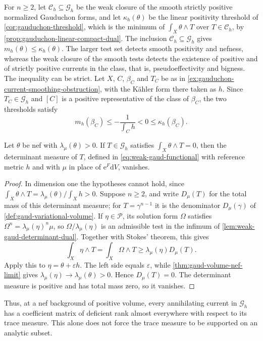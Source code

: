 For $n\geq2$, let $\mathscr C_h\subseteq\mathscr G_h$ be the weak closure of the smooth strictly positive normalized Gauduchon forms, and let $\kappa_h(\theta)$ be the linear positivity threshold of \cref{cor:gauduchon-threshold}, which is the minimum of $\int_X\theta\wedge T$ over $T\in\mathscr C_h$, by \cref{prop:gauduchon-linear-compact-dual}. The inclusion $\mathscr C_h\subseteq\mathscr G_h$ gives
$m_h(\theta)\leq\kappa_h(\theta)$.
The larger test set detects smooth positivity and nefness, whereas the weak closure of the smooth tests detects the existence of positive and of strictly positive currents in the class, that is, pseudoeffectivity and bigness. The inequality can be strict. Let $X$, $C$, $\beta_C$ and $T_C$ be as in \cref{ex:gauduchon-current-smoothing-obstruction}, with the K\"ahler form there taken as $h$. Since $T_C\in\mathscr G_h$ and $[C]$ is a positive representative of the class of $\beta_C$, the two thresholds satisfy
\[
 m_h(\beta_C)\leq-\frac1{\int_Ch}<0
 \leq\kappa_h(\beta_C).
\]

\begin{proposition}\label{prop:nef-annihilator-determinant}
Let $\theta$ be nef with $\lambda_\mu(\theta)>0$. If $T\in\mathscr G_h$ satisfies $\int_X\theta\wedge T=0$, then the determinant measure of $T$, defined in \eqref{eq:weak-gaud-functional} with reference metric $h$ and with $\mu$ in place of $\mathrm e^F\mathrm dV$, vanishes.
\end{proposition}
\begin{proof}
In dimension one the hypotheses cannot hold, since
$\int_X\theta\wedge T=\lambda_\mu(\theta)/\int_Xh>0$.
Suppose $n\geq2$, and write $D_\mu(T)$ for the total mass of this determinant measure; for $T=\gamma^{n-1}$ it is the denominator $D_\mu(\gamma)$ of \cref{def:gaud-variational-volume}. If $\eta\in\mathscr P$, its solution form $\Omega$ satisfies $\Omega^n=\lambda_\mu(\eta)^n\mu$, so $\Omega/\lambda_\mu(\eta)$ is an admissible test in the infimum of \cref{lem:weak-gaud-determinant-dual}. Together with Stokes' theorem, this gives
\[
 \int_X\eta\wedge T=\int_X\Omega\wedge T
              \geq\lambda_\mu(\eta)D_\mu(T).
\]
Apply this to $\eta=\theta+\varepsilon h$. The left side equals $\varepsilon$, while \cref{thm:gaud-volume-nef-limit} gives $\lambda_\mu(\eta)\to\lambda_\mu(\theta)>0$. Hence $D_\mu(T)=0$. The determinant measure is positive and has total mass zero, so it vanishes.
\end{proof}

Thus, at a nef background of positive volume, every annihilating current in $\mathscr G_h$ has a coefficient matrix of deficient rank almost everywhere with respect to its trace measure. This alone does not force the trace measure to be supported on an analytic subset.

